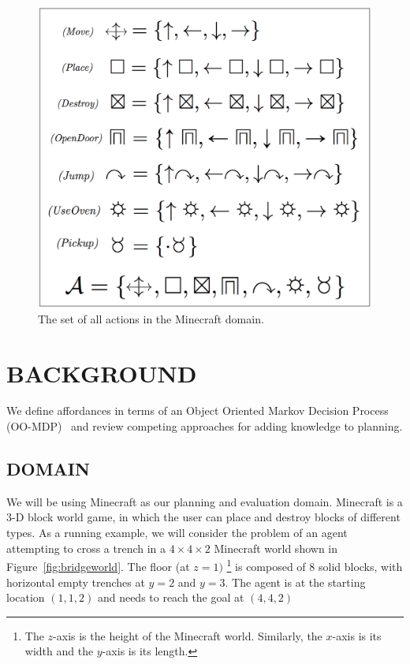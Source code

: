 \documentclass[]{article}
\begin{document}
\begin{figure}
\centering
\includegraphics[scale = 0.15]{figures/all_actions.png}
\caption{The set of all actions in the Minecraft domain. \label{fig:all_actions}}
\end{figure}

\section{BACKGROUND}

We define affordances in terms of an Object Oriented Markov Decision
Process (OO-MDP)~\citep{diuk08} and review competing approaches for
adding knowledge to planning.

\subsection{DOMAIN}

We will be using Minecraft as our planning and evaluation domain. Minecraft
is a 3-D block world game, in which the user can place and destroy blocks of
different types. As a running example, we will consider the problem of an agent
attempting to cross a trench in a $4 \times 4 \times 2$ Minecraft world shown
in Figure~\ref{fig:bridgeworld}. The floor (at $z = 1)$ \footnote{The $z$-axis
is the height of the Minecraft world. Similarly, the $x$-axis is its width and the
$y$-axis is its length.} is composed of 8 solid blocks, with horizontal empty
trenches at $y = 2$ and $y = 3$. The agent is  at the starting location
$(1, 1, 2)$ and needs to reach the goal at $(4,4,2)$
\end{document}
